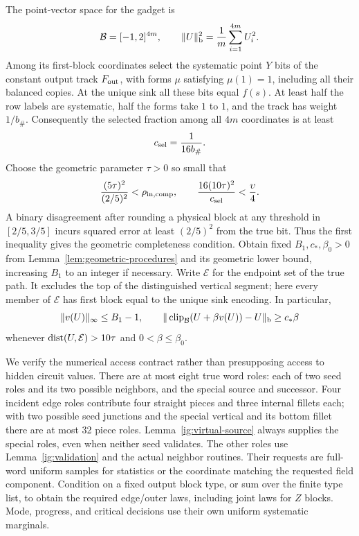 The point-vector space for the gadget is
\begin{equation}\label{ig:point-space}
 \mathcal B=[-1,2]^{4m},\qquad
 \|U\|_{\rm b}^2=\frac1m\sum_{i=1}^{4m}U_i^2.
\end{equation}
Among its first-block coordinates select the systematic point $Y$ bits
of the constant output track $F_{\rm out}$, with forms $\mu$ satisfying
$\mu(1)=1$, including all their balanced copies. At the unique sink all
these bits equal $f(s)$. At least half the row labels are systematic,
half the forms take $1$ to $1$, and the track has weight $1/b_\#$.
Consequently the selected fraction among all $4m$ coordinates is at least
\begin{equation}\label{ig:selection}
 c_{\rm sel}=\frac1{16b_\#}.
\end{equation}
Choose the geometric parameter $\tau>0$ so small that
\begin{equation}\label{ig:tau}
 \frac{(5\tau)^2}{(2/5)^2}<\rho_{\rm in,comp},
 \qquad
 \frac{16(10\tau)^2}{c_{\rm sel}}<\frac{\upsilon}{4}.
\end{equation}
A binary disagreement after rounding a physical block at any threshold
in $[2/5,3/5]$ incurs squared error at least $(2/5)^2$ from the true bit.
Thus the first inequality gives the geometric completeness condition.
Obtain fixed $B_1,c_*,\beta_0>0$ from
Lemma~\ref{lem:geometric-procedures} and its geometric lower bound,
increasing $B_1$ to an integer if necessary. Write $\mathcal E$ for the
endpoint set of the true path. It excludes the top of the distinguished
vertical segment; here every member of $\mathcal E$ has first block equal
to the unique sink encoding. In particular,
\begin{equation}\label{ig:geometric-bound}
 \|v(U)\|_\infty\le B_1-1,
 \qquad
 \|\operatorname{clip}_{\mathcal B}(U+\beta v(U))-U\|_{\rm b}\ge c_*\beta
\end{equation}
whenever $\operatorname{dist}(U,\mathcal E)>10\tau$ and $0<\beta\le\beta_0$.

We verify the numerical access contract rather than presupposing access
to hidden circuit values. There are at most eight true word roles: each
of two seed roles and its two possible neighbors, and the special source
and successor. Four incident edge roles contribute four straight pieces
and three internal fillets each; with two possible seed junctions and
the special vertical and its bottom fillet there are at most 32 piece
roles. Lemma~\ref{ig:virtual-source} always supplies the special roles,
even when neither seed validates. The other roles use
Lemma~\ref{ig:validation} and the actual neighbor routines. Their requests
are full-word uniform samples for statistics or the coordinate matching
the requested field component. Condition on a fixed output block type,
or sum over the finite type list, to obtain the required edge/outer laws,
including joint laws for $Z$ blocks. Mode, progress, and critical decisions
use their own uniform systematic marginals.

